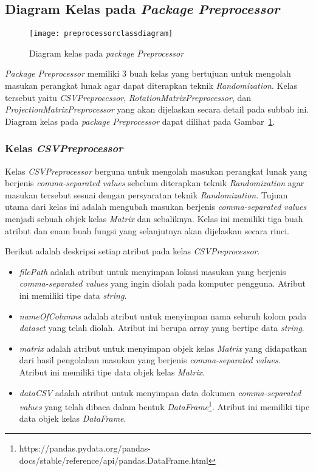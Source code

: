 \subsection{Diagram Kelas pada \textit{Package Preprocessor}}
\label{subsec:diagram-kelas-preprocessor}

\begin{figure}
	\centering
	\texttt{[image: preprocessorclassdiagram]}
	\caption{Diagram kelas pada \textit{package Preprocessor}}
	\label{fig:preprocessorclassdiagram}
\end{figure}

\textit{Package Preprocessor} memiliki 3 buah kelas yang bertujuan untuk mengolah masukan perangkat lunak agar dapat diterapkan teknik \textit{Randomization}. Kelas tersebut yaitu \textit{CSVPreprocessor}, \textit{RotationMatrixPreprocessor}, dan \textit{ProjectionMatrixPreprocessor} yang akan dijelaskan secara detail pada subbab ini. Diagram kelas pada \textit{package Preprocessor} dapat dilihat pada Gambar~\ref{fig:preprocessorclassdiagram}.

\subsubsection{Kelas \textit{CSVPreprocessor}}
\label{subsubsec:kelas-csvpreprocessor}

Kelas \textit{CSVPreprocessor} berguna untuk mengolah masukan perangkat lunak yang berjenis \textit{comma-separated values} sebelum diterapkan teknik \textit{Randomization} agar masukan tersebut sesuai dengan persyaratan teknik \textit{Randomization}. Tujuan utama dari kelas ini adalah mengubah masukan berjenis \textit{comma-separated values} menjadi sebuah objek kelas \textit{Matrix} dan sebaliknya. Kelas ini memiliki tiga buah atribut dan enam buah fungsi yang selanjutnya akan dijelaskan secara rinci.

Berikut adalah deskripsi setiap atribut pada kelas \textit{CSVPreprocessor}.
\begin{itemize}
	\item \textit{filePath} adalah atribut untuk menyimpan lokasi masukan yang berjenis \textit{comma-separated values} yang ingin diolah pada komputer pengguna. Atribut ini memiliki tipe data \textit{string}.
	\item \textit{nameOfColumns} adalah atribut untuk menyimpan nama seluruh kolom pada \textit{dataset} yang telah diolah. Atribut ini berupa array yang bertipe data \textit{string}.
	\item \textit{matrix} adalah atribut untuk menyimpan objek kelas \textit{Matrix} yang didapatkan dari hasil pengolahan masukan yang berjenis \textit{comma-separated values}. Atribut ini memiliki tipe data objek kelas \textit{Matrix}.
	\item \textit{dataCSV} adalah atribut untuk menyimpan data dokumen \textit{comma-separated values} yang telah dibaca dalam bentuk \textit{DataFrame}\footnote{https://pandas.pydata.org/pandas-docs/stable/reference/api/pandas.DataFrame.html}. Atribut ini memiliki tipe data objek kelas \textit{DataFrame}.
\end{itemize}

